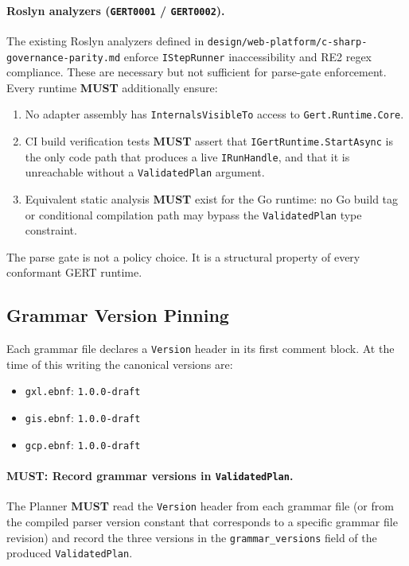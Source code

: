 \paragraph{Roslyn analyzers (\texttt{GERT0001} / \texttt{GERT0002}).}
The existing Roslyn analyzers defined in
\texttt{design/web-platform/c-sharp-governance-parity.md} enforce
\texttt{IStepRunner} inaccessibility and RE2 regex compliance.  These are
necessary but not sufficient for parse-gate enforcement.  Every runtime
\textbf{MUST} additionally ensure:

\begin{enumerate}
  \item No adapter assembly has \texttt{InternalsVisibleTo} access to
    \texttt{Gert.Runtime.Core}.
  \item CI build verification tests \textbf{MUST} assert that
    \texttt{IGertRuntime.StartAsync} is the only code path that produces
    a live \texttt{IRunHandle}, and that it is unreachable without a
    \texttt{ValidatedPlan} argument.
  \item Equivalent static analysis \textbf{MUST} exist for the Go runtime:
    no Go build tag or conditional compilation path may bypass the
    \texttt{ValidatedPlan} type constraint.
\end{enumerate}

\noindent
The parse gate is not a policy choice.  It is a structural property of every
conformant GERT runtime.

\subsection{Grammar Version Pinning}
\label{sec:parse-gate:version-pinning}

Each grammar file declares a \texttt{Version} header in its first comment
block.  At the time of this writing the canonical versions are:

\begin{itemize}
  \item \texttt{gxl.ebnf}: \texttt{1.0.0-draft}
  \item \texttt{gis.ebnf}: \texttt{1.0.0-draft}
  \item \texttt{gcp.ebnf}: \texttt{1.0.0-draft}
\end{itemize}

\paragraph{MUST: Record grammar versions in \texttt{ValidatedPlan}.}
The Planner \textbf{MUST} read the \texttt{Version} header from each grammar
file (or from the compiled parser version constant that corresponds to a
specific grammar file revision) and record the three versions in the
\texttt{grammar\_versions} field of the produced \texttt{ValidatedPlan}.

